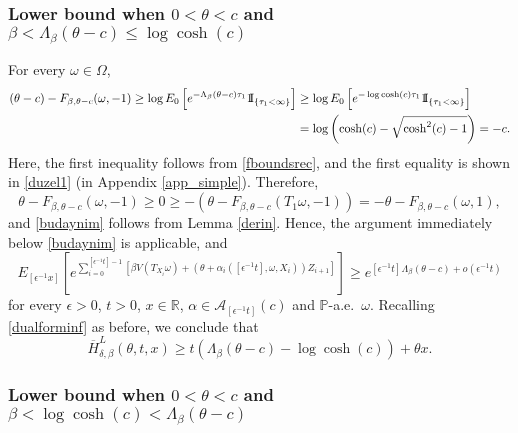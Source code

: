 \documentclass[a4paper]{amsart}
\numberwithin{equation}{section}
\theoremstyle{plain}
\theoremstyle{remark}
\begin{document}
\subsubsection{Lower bound when $0 < \theta < c$ and $\beta < \Lambda_\beta(\theta - c) \le \log\cosh(c)$}\label{bundanibaret}

For every $\omega\in\Omega$,
\begin{align*}
(\theta -c) - F_{\beta,\theta-c}(\omega,-1) \ge \log E_0\left[e^{-\Lambda_\beta(\theta - c)\tau_1}{{{\rm 1\mkern-1.5mu}\!{\rm I}}}_{\{\tau_1<\infty\}}\right] &\ge \log E_0\left[e^{-\log\cosh(c)\tau_1}{{{\rm 1\mkern-1.5mu}\!{\rm I}}}_{\{\tau_1<\infty\}}\right]\\
&= \log\left(\cosh(c) - \sqrt{\cosh^2(c) - 1}\right) = -c.
\end{align*}
Here, the first inequality follows from \eqref{fboundsrec}, and the first equality is shown in \eqref{duzel1} (in Appendix \ref{app_simple}). Therefore,
$$\theta - F_{\beta,\theta-c}(\omega,-1) \ge 0 \ge -(\theta - F_{\beta,\theta-c}(T_1\omega,-1)) = -\theta - F_{\beta,\theta-c}(\omega,1),$$
and \eqref{budaynim} follows from Lemma \ref{derin}. Hence, the argument immediately below \eqref{budaynim} is applicable, and
$$E_{[{\epsilon^{-1}} x]}\left[e^{\sum_{i=0}^{[{\epsilon^{-1}} t]-1} [\beta V(T_{X_i}\omega) + (\theta + \alpha_i([{\epsilon^{-1}} t],\omega,X_i))Z_{i+1}]}\right] \ge e^{[{\epsilon^{-1}} t]\Lambda_\beta(\theta - c) + o({\epsilon^{-1}} t)}$$
for every ${\epsilon}>0$, $t>0$, $x\in\mathbb{R}$, $\alpha\in\mathcal{A}_{[{\epsilon^{-1}} t]}(c)$ and $\mathbb{P}$-a.e.\ $\omega$. Recalling \eqref{dualforminf} as before, we conclude that
\begin{equation}\label{LBpart3}
\overline H_{\delta,\beta}^L(\theta,t,x) \ge t(\Lambda_\beta(\theta - c) - \log\cosh(c)) + \theta x.
\end{equation}

\subsubsection{Lower bound when $0 < \theta < c$ and $\beta < \log\cosh(c) < \Lambda_\beta(\theta - c)$}\label{bidebuvar}
\end{document}

